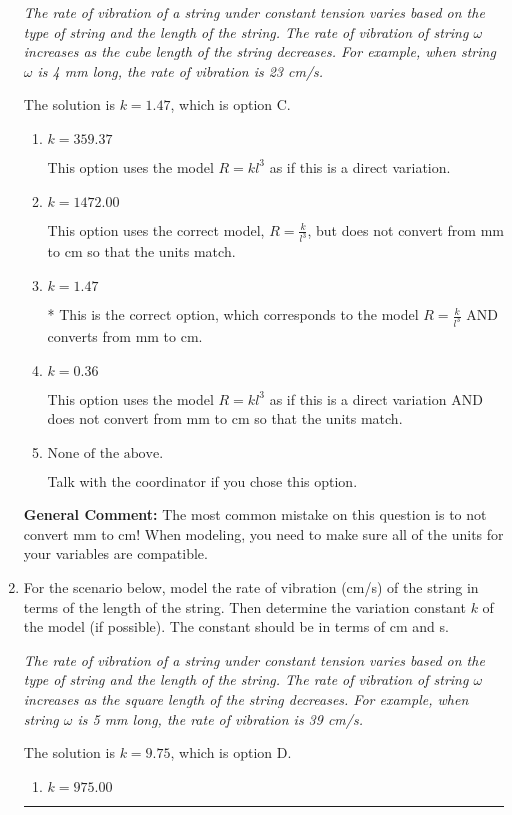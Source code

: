 \documentclass{extbook}[14pt]
\newcommand{\litem}[1]{\item #1

\rule{\textwidth}{0.4pt}}
\begin{document}
\begin{enumerate}
{\begin{center}
    \textit{ The rate of vibration of a string under constant tension varies based on the type of string and the length of the string. The rate of vibration of string $\omega$ increases as the cube length of the string decreases. For example, when string $\omega$ is 4 mm long, the rate of vibration is 23 cm/s. }
\end{center}
The solution is \( k = 1.47 \), which is option C.\begin{enumerate}[label=\Alph*.]
\item \( k = 359.37 \)

This option uses the model $R = kl^{3}$ as if this is a direct variation.
\item \( k = 1472.00 \)

This option uses the correct model, $R = \frac{k}{l^{3}}$, but does not convert from mm to cm so that the units match.
\item \( k = 1.47 \)

* This is the correct option, which corresponds to the model $R = \frac{k}{l^{3}}$ AND converts from mm to cm.
\item \( k = 0.36 \)

This option uses the model $R = kl^{3}$ as if this is a direct variation AND does not convert from mm to cm so that the units match.
\item \( \text{None of the above.} \)

Talk with the coordinator if you chose this option.
\end{enumerate}

\textbf{General Comment:} The most common mistake on this question is to not convert mm to cm! When modeling, you need to make sure all of the units for your variables are compatible.
}
\litem{
For the scenario below, model the rate of vibration (cm/s) of the string in terms of the length of the string. Then determine the variation constant $k$ of the model (if possible). The constant should be in terms of cm and s.

\begin{center}
    \textit{ The rate of vibration of a string under constant tension varies based on the type of string and the length of the string. The rate of vibration of string $\omega$ increases as the square length of the string decreases. For example, when string $\omega$ is 5 mm long, the rate of vibration is 39 cm/s. }
\end{center}
The solution is \( k = 9.75 \), which is option D.\begin{enumerate}[label=\Alph*.]
\item \( k = 975.00 \)


\end{enumerate}}
\end{enumerate}
\end{document}
